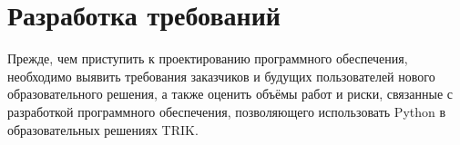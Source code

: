 \documentclass[14pt]{matmex-diploma-custom}
\begin{document}
\begin{table}[]
\centering
{}
\caption{Сравнение фреймворков}
\label{table:frameworkComparison}
\end{table}

\section{Разработка требований}
Прежде, чем приступить к проектированию программного обеспечения, необходимо выявить требования заказчиков и будущих пользователей нового образовательного решения, а также оценить объёмы работ и риски, связанные с разработкой программного обеспечения, позволяющего использовать Python в образовательных решениях TRIK. 
\end{document}
